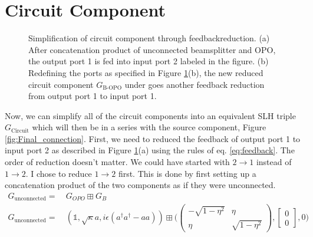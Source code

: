 \documentclass[a4paper]{article}
\theoremstyle{definition}
\begin{document}
\section*{Circuit Component}
\begin{figure}[H]
\centering
     \hspace{2cm}

     \caption{Simplification of circuit component through feedbackreduction. (a) After concatenation product of unconnected beamsplitter and OPO, the output port 1 is fed into input port 2 labeled in the figure. (b) Redefining the ports as specified in Figure \ref{fig:circuit}(b), the new reduced circuit  component $G_{\text{B-OPO}}$ under goes another feedback reduction from output port 1 to input port 1.}
     \label{fig:circuit}
\end{figure}     
Now, we can simplify all of the circuit components into an equivalent SLH triple $G_{\text{Circuit}}$ which will then be in a series with the source component, Figure \ref{fig:Final_connection}. First, we need to reduced the feedback of output port 1 to input port 2 as described in Figure \ref{fig:circuit}(a) using the rules of eq. \ref{eq:feedback}. The order of reduction doesn't matter. We could have started with $2 \rightarrow 1$ instead of $1 \rightarrow 2$. I chose to reduce $1 \rightarrow 2$ first. This is done by first setting up a concatenation product of the two components as if they were unconnected.
\begin{align*}
    G_{\text{unconnected}} = & \ G_{OPO}  \boxplus G_B \\
    G_{\text{unconnected}} = & \  (\mathbb{1}, \sqrt{\kappa}a, i\epsilon(a^\dagger a^\dagger - a a))   \boxplus \Bigg( \begin{pmatrix} -\sqrt{1-\eta^2} & \eta \\ \eta & \sqrt{1-\eta^2} \end{pmatrix},\begin{bmatrix} 0 \\ 0\end{bmatrix}, 0 \Bigg)
\end{align*}
\end{document}

